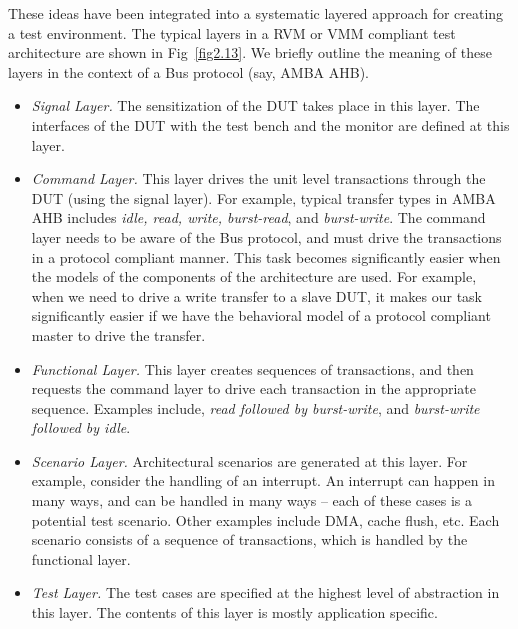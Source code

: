 \noindent
These ideas have been integrated into a systematic layered approach for
creating a test environment. The typical layers in a RVM or VMM compliant
test architecture are shown in Fig~\ref{fig2.13}. We briefly outline the
meaning of these layers in the context of a Bus protocol (say, AMBA AHB).
\begin{itemize}

\item {\em Signal Layer.}
    The sensitization of the DUT takes place in this
    layer. The interfaces of the DUT with the test bench and the monitor
    are defined at this layer.

\item {\em Command Layer.} 
    This layer drives the unit level transactions
    through the DUT (using the signal layer). For example, typical
    transfer types in AMBA AHB includes {\em idle, read, write,
    burst-read}, and {\em burst-write}. The command layer needs to be
    aware of the Bus protocol, and must drive the transactions in a
    protocol compliant manner. This task becomes significantly easier
    when the models of the components of the architecture are used. For
    example, when we need to drive a write transfer to a slave DUT, it
    makes our task significantly easier if we have the behavioral model
    of a protocol compliant master to drive the transfer.

\item {\em Functional Layer.} 
    This layer creates sequences of transactions,
    and then requests the command layer to drive each transaction in the
    appropriate sequence. Examples include, {\em read followed by
    burst-write}, and {\em burst-write followed by idle}.

\item {\em Scenario Layer.} 
    Architectural scenarios are generated at this 
	layer. For example, consider the handling of an interrupt. An
    interrupt can happen in many ways, and can be handled in many ways
    -- each of these cases is a potential test scenario. Other examples
    include DMA, cache flush, etc. Each scenario consists of a sequence
    of transactions, which is handled by the functional layer.

\item {\em Test Layer.} 
    The test cases are specified at the highest level
    of abstraction in this layer. The contents of this layer is mostly
    application specific.	

\end{itemize}

